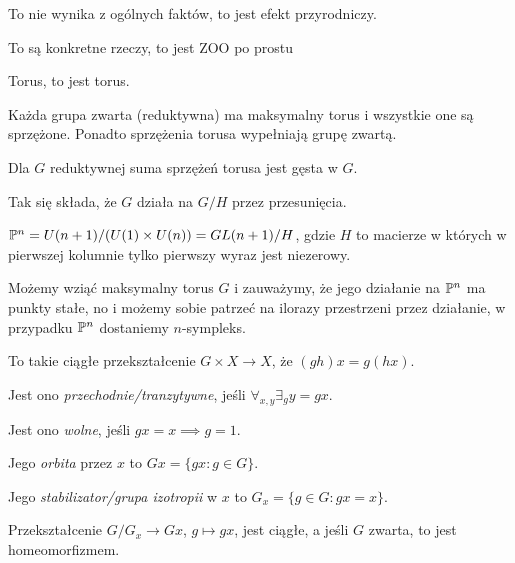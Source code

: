  \begin{cytat}
  To nie wynika z ogólnych faktów, to jest efekt przyrodniczy.
 \end{cytat}
  
 \begin{cytat}
  To są konkretne rzeczy, to jest ZOO po prostu
 \end{cytat}
 
 \begin{cytat}
  Torus, to jest torus.
 \end{cytat}
 
 \begin{twierdzeniebd}
  Każda grupa zwarta (reduktywna) ma maksymalny torus i wszystkie one są sprzężone. Ponadto sprzężenia torusa wypełniają grupę zwartą.
 \end{twierdzeniebd}
 
 \begin{twierdzeniebd}
  Dla $G$ reduktywnej suma sprzężeń torusa jest gęsta w $G$.
 \end{twierdzeniebd}
 
 Tak się składa, że $G$ działa na $G/H$ przez przesunięcia.
 
 \begin{przyklad}
  ${\mathbb{P}}^n = U(n+1)/(U(1)\times U(n)) = GL(n+1)/H$, gdzie $H$ to macierze w których w pierwszej kolumnie tylko pierwszy wyraz jest niezerowy.
  
  Możemy wziąć maksymalny torus $G$ i zauważymy, że jego działanie na ${\mathbb{P}}^n$ ma punkty stałe, no i możemy sobie patrzeć na ilorazy przestrzeni przez działanie, w przypadku ${\mathbb{P}}^n$ dostaniemy $n$-sympleks.
 \end{przyklad}
 
 \begin{definicja}
  To takie ciągłe przekształcenie $G \times X \to X$, że $(gh)x=g(hx)$.
  
  Jest ono \emph{przechodnie/tranzytywne}, jeśli $\forall_{x,y} \exists_g y=gx$.
  
  Jest ono \emph{wolne}, jeśli $gx=x \implies g=1$.
  
  Jego \emph{orbita} przez $x$ to $Gx = \{gx: g \in G\}$.
  
  Jego \emph{stabilizator/grupa izotropii} w $x$ to $G_x = \{ g \in G: gx=x \}$.
 \end{definicja}
 
 \begin{uwaga}
  Przekształcenie $G/G_x \to Gx$, $g \mapsto gx$, jest ciągłe, a jeśli $G$ zwarta, to jest homeomorfizmem.
 \end{uwaga}
 
